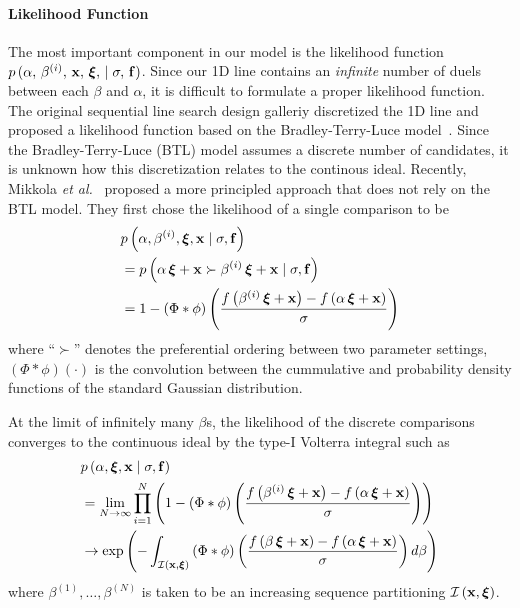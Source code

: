 \paragraph{Likelihood Function}
The most important component in our model is the likelihood function \(p\,(\alpha,\, \beta^{(i)},\, \mathbf{x},\,\bm{\xi},\, \mid \sigma,\, \mathbf{f})\).
Since our 1D line contains an \textit{infinite} number of duels between each \(\beta\) and \(\alpha\), it is difficult to formulate a proper likelihood function.
The original sequential line search design galleriy discretized the 1D line and proposed a likelihood function based on the Bradley-Terry-Luce model~\cite{10.1145/3072959.3073598}.
Since the Bradley-Terry-Luce (BTL) model assumes a discrete number of candidates, it is unknown how this discretization relates to the continous ideal.
Recently, Mikkola \textit{et al.}~\cite{pmlr-v119-mikkola20a} proposed a more principled approach that does not rely on the BTL model.
They first chose the likelihood of a single comparison to be 
\begin{align}
  &p\left(\alpha, \beta^{(i)}, \bm{\xi}, \mathbf{x} \mid \sigma, \mathbf{f} \right) \\
  &= p\left(\alpha \, \bm{\xi} + \mathbf{x} \succ \beta^{(i)} \, \bm{\xi} + \mathbf{x} \mid \sigma, \mathbf{f} \right) \\
  &= 1 - \left(\Phi * \phi \right)\left( \frac{ f\left(\beta^{(i)} \, \bm{\xi} + \mathbf{x} \right) - f\left(\alpha \, \bm{\xi} + \mathbf{x} \right) }{\sigma} \right)
\end{align}
{\noindent}where ``\(\succ\)'' denotes the preferential ordering between two parameter settings, \(\left(\Phi*\phi\right)\left(\cdot\right)\) is the convolution between the cummulative and probability density functions of the standard Gaussian distribution. 

At the limit of infinitely many \(\beta\)s, the likelihood of the discrete comparisons converges to the continuous ideal by the type-I Volterra integral such as
{\small
\begin{align}
  &p\left(\alpha, \bm{\xi}, \mathbf{x} \mid \sigma, \mathbf{f} \right) \\
  &= \lim_{N \rightarrow \infty} \prod^{N}_{i=1} \left(  1 - \left(\Phi * \phi \right)\left( \frac{ f\left(\beta^{(i)} \, \bm{\xi} + \mathbf{x} \right) - f\left(\alpha \, \bm{\xi} + \mathbf{x} \right) }{\sigma} \right) \right) \\
  &\rightarrow \exp\left(  - \int_{\mathcal{I}\left(\mathbf{x}, \bm{\xi}\right)} \left(\Phi * \phi \right) \left( \frac{ f\left(\beta \, \bm{\xi} + \mathbf{x} \right) - f\left(\alpha \, \bm{\xi} + \mathbf{x} \right) }{\sigma} \right) d\beta \right)
\end{align}
}%
%
{\noindent}where \(\beta^{(1)}, \ldots, \beta^{(N)}\) is taken to be an increasing sequence partitioning \(\mathcal{I\left(\mathbf{x}, \bm{\xi}\right)}\).

